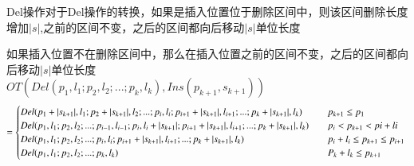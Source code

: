 \par Del操作对于Del操作的转换，如果是插入位置位于删除区间中，则该区间删除长度增加$|s|$,之前的区间不变，之后的区间都向后移动$|s|$单位长度
\par 如果插入位置不在删除区间中，那么在插入位置之前的区间不变，之后的区间都向后移动$|s|$单位长度\\
$OT(Del(p_1,l_1;p_2,l_2;...;p_k,l_k),Ins(p_{k+1},s_{k+1}))$\\
\begin{equation}
= \begin{cases}
Del(p_1+|s_{k+1}|,l_1;p_2+|s_{k+1}|,l_2;...;p_i,l_i;p_{i+1}+|s_{k+1}|,l_{i+1};...;p_k+|s_{k+1}|,l_k) & \quad p_{k+1} \le p_1 \\
Del(p_1,l_1;p_2,l_2;...;p_{i-1},l_{i-1};p_i,l_i+|s_{k+1}|;p_{i+1}+|s_{k+1}|,l_{i+1};...;p_k+|s_{k+1}|,l_k) &\quad p_i<p_{k+1} < pi+li \\
Del(p_1,l_1;p_2,l_2;...;p_i,l_i;p_{i+1}+|s_{k+1}|,l_{i+1};...;p_k+|s_{k+1}|,l_k) & \quad p_i+l_i \le p_{k+1} \le p_{i+1}\\
Del(p_1,l_1;p_2,l_2;...;p_k,l_k) &\quad P_k+l_k \le p_{k+1} \\
 \end{cases}\\
\end{equation}

